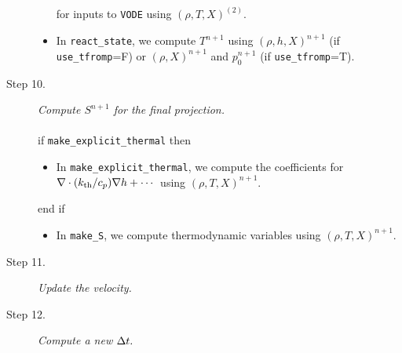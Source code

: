 \begin{description}
\begin{itemize}
for inputs to {\tt VODE} using $(\rho,T,X)^{(2)}$.
\item In {\tt react\_state}, we compute $T^{n+1}$ using $(\rho,h,X)^{n+1}$ 
(if {\tt use\_tfromp}=F) or $(\rho,X)^{n+1}$ and $p_0^{n+1}$ (if {\tt use\_tfromp}=T).
\end{itemize}
\item[Step 10.] {\em Compute $S^{n+1}$ for the final projection.}\\ \\
if {\tt make\_explicit\_thermal} then
\begin{itemize}
\item In {\tt make\_explicit\_thermal}, we compute the coefficients for 
$\nabla\cdot(k_{\rm th}/c_p)\nabla h + \cdots$ using $(\rho,T,X)^{n+1}$.
\end{itemize}
end if
\begin{itemize}
\item In {\tt make\_S}, we compute thermodynamic variables using $(\rho,T,X)^{n+1}$.
\end{itemize}
\item[Step 11.] {\em Update the velocity.}
\item[Step 12.] {\em Compute a new $\Delta t.$}
\end{description}
